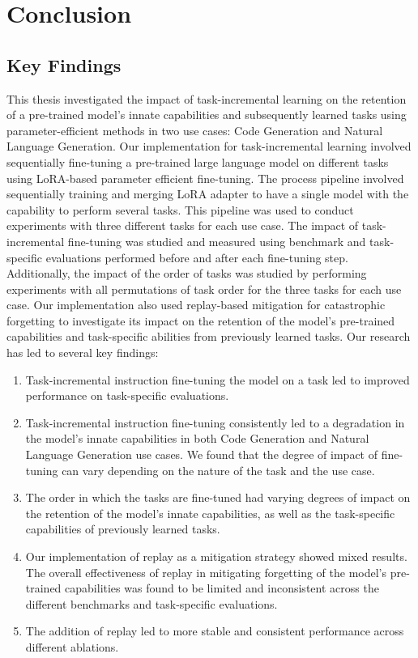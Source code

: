 \chapter{Conclusion} %

\label{Conclusion} 

\section{Key Findings}
This thesis investigated the impact of task-incremental learning on the retention of a pre-trained model’s innate capabilities and subsequently learned tasks using parameter-efficient methods in two use cases: Code Generation and Natural Language Generation. Our implementation for task-incremental learning involved sequentially fine-tuning a pre-trained large language model on different tasks using LoRA-based parameter efficient fine-tuning.  The process pipeline involved sequentially training and merging LoRA adapter to have a single model with the capability to perform several tasks. This pipeline was used to conduct experiments with three different tasks for each use case. The impact of task-incremental fine-tuning was studied and measured using benchmark and task-specific evaluations performed before and after each fine-tuning step. Additionally, the impact of the order of tasks was studied by performing experiments with all permutations of task order for the three tasks for each use case. Our implementation also used replay-based mitigation for catastrophic forgetting to investigate its impact on the retention of the model’s pre-trained capabilities and task-specific abilities from previously learned tasks. Our research has led to several key findings:
\begin{enumerate}
\item Task-incremental instruction fine-tuning the model on a task led to improved performance on task-specific evaluations.
\item Task-incremental instruction fine-tuning consistently led to a degradation in the model’s innate capabilities in both Code Generation and Natural Language Generation use cases. We found that the degree of impact of fine-tuning can vary depending on the nature of the task and the use case. 
\item The order in which the tasks are fine-tuned had varying degrees of impact on the retention of the model's innate capabilities, as well as the task-specific capabilities of previously learned tasks.
\item Our implementation of replay as a mitigation strategy showed mixed results. The overall effectiveness of replay in mitigating forgetting of the model's pre-trained capabilities was found to be limited and inconsistent across the different benchmarks and task-specific evaluations. 
\item The addition of replay led to more stable and consistent performance across different ablations. 
\end{enumerate}

